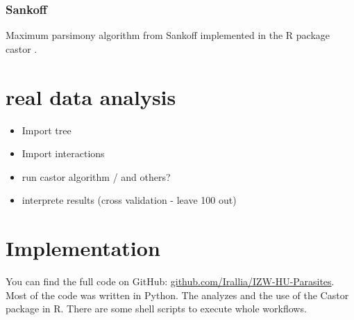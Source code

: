       \subsubsection{Sankoff}
        Maximum parsimony algorithm from Sankoff implemented in the R package castor \cite{Louca2017}.


  \section{real data analysis}
    \begin{itemize}
      \item Import tree
      \item Import interactions
      \item run castor algorithm / and others?
      \item interprete results (cross validation - leave 100 out)
    \end{itemize}

  \section{Implementation}
    You can find the full code on GitHub: 
      \hyperlink{github.com/Irallia/IZW-HU-Parasites}{github.com/Irallia/IZW-HU-Parasites}. \\
    Most of the code was written in Python. The analyzes and the use of the Castor package in R. There 
      are some shell scripts to execute whole workflows.

